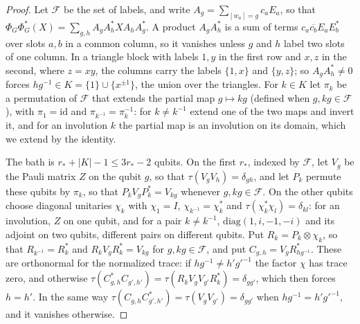 \begin{proof}
Let $\mathcal F$ be the set of labels, and write $A_g=\sum_{[w_a]=g}c_aE_a$, so that $\Phi_G\Phi_G^*(X)=\sum_{g,h}A_gA_h^*XA_hA_g^*$. A product $A_gA_h^*$
is a sum of terms $c_a\overline{c_b}E_aE_b^*$ over slots $a,b$ in a common column, so it vanishes unless $g$ and $h$ label two slots of one column. In a
triangle block with labels $1,y$ in the first row and $x,z$ in the second, where $z=xy$, the columns carry the labels $\{1,x\}$ and $\{y,z\}$; so
$A_gA_h^*\ne0$ forces $hg^{-1}\in K=\{1\}\cup\{x^{\pm1}\}$, the union over the triangles. For $k\in K$ let $\pi_k$ be a permutation of $\mathcal F$ that
extends the partial map $g\mapsto kg$ (defined when $g,kg\in\mathcal F$), with $\pi_1=\mathrm{id}$ and $\pi_{k^{-1}}=\pi_k^{-1}$: for $k\ne k^{-1}$ extend
one of the two maps and invert it, and for an involution $k$ the partial map is an involution on its domain, which we extend by the identity.

The bath is $r_*+|K|-1\le3r_*-2$ qubits. On the first $r_*$, indexed by $\mathcal F$, let $V_g$ be the Pauli matrix $Z$ on the qubit $g$, so that
$\tau(V_gV_h)=\delta_{gh}$, and let $P_k$ permute these qubits by $\pi_k$, so that $P_kV_gP_k^*=V_{kg}$ whenever $g,kg\in\mathcal F$. On the other
qubits choose diagonal unitaries $\chi_k$ with $\chi_1=I$, $\chi_{k^{-1}}=\chi_k^*$ and $\tau(\chi_k^*\chi_l)=\delta_{kl}$: for an involution, $Z$ on one
qubit, and for a pair $k\ne k^{-1}$, $\mathrm{diag}(1,i,-1,-i)$ and its adjoint on two qubits, different pairs on different qubits. Put
$R_k=P_k\otimes\chi_k$, so that $R_{k^{-1}}=R_k^*$ and $R_kV_gR_k^*=V_{kg}$ for $g,kg\in\mathcal F$, and put $C_{g,h}=V_gR_{hg^{-1}}^*$. These are
orthonormal for the normalized trace: if $hg^{-1}\ne h'g'^{-1}$ the factor $\chi$ has trace zero, and otherwise
$\tau(C_{g,h}^*C_{g',h'})=\tau(R_kV_gV_{g'}R_k^*)=\delta_{gg'}$, which then forces $h=h'$. In the same way
$\tau(C_{g,h}C_{g',h'}^*)=\tau(V_gV_{g'})=\delta_{gg'}$ when $hg^{-1}=h'g'^{-1}$, and it vanishes otherwise.


\end{proof}
